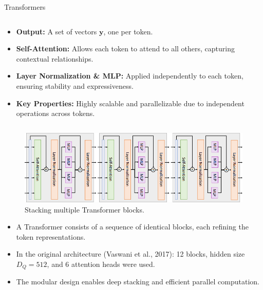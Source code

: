 \begin{frame}[allowframebreaks]{Transformers}
\begin{columns}
\begin{column}{0.45\textwidth}
\begin{itemize}
                \item \textbf{Output:} A set of vectors $\mathbf{y}$, one per token.
                \item \textbf{Self-Attention:} Allows each token to attend to all others, capturing contextual relationships.
                \item \textbf{Layer Normalization \& MLP:} Applied independently to each token, ensuring stability and expressiveness.
                \item \textbf{Key Properties:} Highly scalable and parallelizable due to independent operations across tokens.
            \end{itemize}
        \end{column}
    \end{columns}

    \framebreak

    \begin{figure}
        \flushleft
        \includegraphics[width=\linewidth,height=\textheight,keepaspectratio]{images/transformers/slide_57_1_img.png}
        \caption{Stacking multiple Transformer blocks.}
    \end{figure}
    \vspace{-0.2em}
    \begin{itemize}
        \item A Transformer consists of a sequence of identical blocks, each refining the token representations.
        \item In the original architecture (Vaswani et al., 2017): 12 blocks, hidden size $D_Q = 512$, and 6 attention heads were used.
        \item The modular design enables deep stacking and efficient parallel computation.
    \end{itemize}
\end{frame}